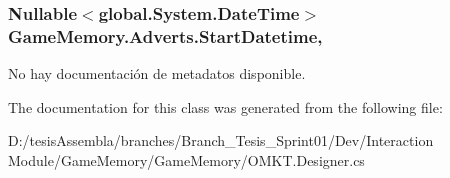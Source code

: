 \hypertarget{class_game_memory_1_1_adverts_a6f50aaad65f26ececf1f0e9d69dc006a}{
\subsubsection[{Start\-Datetime}]{\setlength{\rightskip}{0pt plus 5cm}Nullable$<$global.\-System.\-Date\-Time$>$ Game\-Memory.\-Adverts.\-Start\-Datetime\hspace{0.3cm}{\ttfamily [get]}, {\ttfamily [set]}}}\label{class_game_memory_1_1_adverts_a6f50aaad65f26ececf1f0e9d69dc006a}


No hay documentación de metadatos disponible. 



The documentation for this class was generated from the following file\-:\begin{DoxyCompactItemize}
\item 
D\-:/tesis\-Assembla/branches/\-Branch\-\_\-\-Tesis\-\_\-\-Sprint01/\-Dev/\-Interaction Module/\-Game\-Memory/\-Game\-Memory/O\-M\-K\-T.\-Designer.\-cs\end{DoxyCompactItemize}
